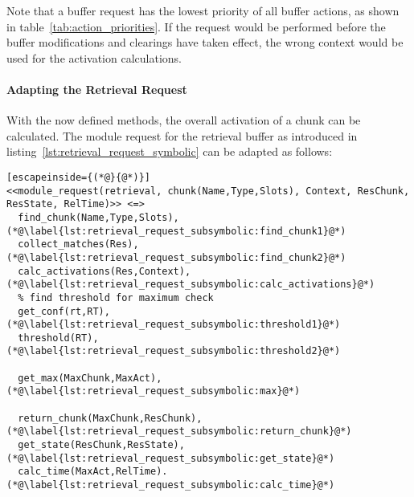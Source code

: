 Note that a buffer request has the lowest priority of all buffer actions, as shown in table~\ref{tab:action_priorities}. If the request would be performed before the buffer modifications and clearings have taken effect, the wrong context would be used for the activation calculations.

\paragraph{Adapting the Retrieval Request}

With the now defined methods, the overall activation of a chunk can be calculated. The module request for the retrieval buffer as introduced in listing~\ref{lst:retrieval_request_symbolic} can be adapted as follows:

\begin{lstlisting}[escapeinside={(*@}{@*)}]
<<module_request(retrieval, chunk(Name,Type,Slots), Context, ResChunk, ResState, RelTime)>> <=> 
  find_chunk(Name,Type,Slots), (*@\label{lst:retrieval_request_subsymbolic:find_chunk1}@*)
  collect_matches(Res), (*@\label{lst:retrieval_request_subsymbolic:find_chunk2}@*)
  calc_activations(Res,Context), (*@\label{lst:retrieval_request_subsymbolic:calc_activations}@*)
  % find threshold for maximum check
  get_conf(rt,RT), (*@\label{lst:retrieval_request_subsymbolic:threshold1}@*)
  threshold(RT), (*@\label{lst:retrieval_request_subsymbolic:threshold2}@*)
  
  get_max(MaxChunk,MaxAct), (*@\label{lst:retrieval_request_subsymbolic:max}@*)
  
  return_chunk(MaxChunk,ResChunk), (*@\label{lst:retrieval_request_subsymbolic:return_chunk}@*)
  get_state(ResChunk,ResState), (*@\label{lst:retrieval_request_subsymbolic:get_state}@*)
  calc_time(MaxAct,RelTime). (*@\label{lst:retrieval_request_subsymbolic:calc_time}@*)
\end{lstlisting}

